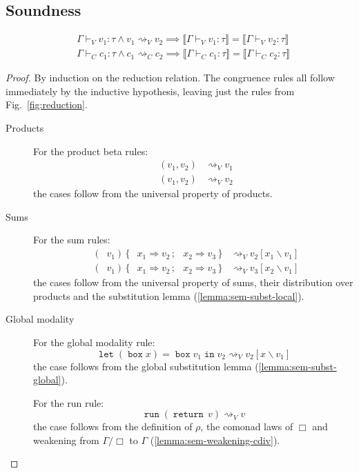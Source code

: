 \documentclass[acmsmall, screen, review, anonymous]{acmart}
\theoremstyle{definition}
\newcommand{\glob}{\mathop{\Box}}
\newcommand{\sem}[1]{\llbracket #1 \rrbracket}
\newcommand{\ununit}{\rho}
\newcommand{\seq}{\,;\,}
\newcommand{\fstname}{\mathop{\pi_1}}
\newcommand{\fst}[1]{\fstname #1}
\newcommand{\sndname}{\mathop{\pi_2}}
\newcommand{\snd}[1]{\sndname #1}
\newcommand{\inlname}{\mathop{\mathtt{in}_L}}
\newcommand{\inl}[1]{\inlname #1}
\newcommand{\inrname}{\mathop{\mathtt{in}_R}}
\newcommand{\inr}[1]{\inrname #1}
\newcommand{\casename}{\mathtt{case}}
\newcommand{\casemname}{\casename^{m}}
\newcommand{\casem}[5]{\mathop{\casemname} #1 \,\{\,\inl{#2} \Rightarrow #3 \seq \inr{#4} \Rightarrow #5 \,\}}
\newcommand{\types}{\mathrel{:}}
\newcommand{\cdiv}[1]{#1/\Box}
\newcommand{\returnname}{\mathop{\mathtt{return}}}
\newcommand{\return}[1]{\returnname\, #1}
\newcommand{\gboxname}{\mathop{\mathtt{box}}}
\newcommand{\gbox}[1]{\gboxname #1}
\newcommand{\gunbox}[3]{\mathop{\mathtt{let}} (\gbox{#1}) = #2 \mathop{\mathtt{in}} #3}
\newcommand{\grunname}{\mathtt{run}}
\newcommand{\grun}[1]{\mathop{\grunname}(#1)}
\newcommand{\sub}[2]{[#1\backslash#2]}
\newcommand{\sbst}[3]{#1\sub{#2}{#3}}
\newcommand{\turnv}{\mathrel{\vdash_V}}
\newcommand{\turnc}{\mathrel{\vdash_C}}
\newcommand{\stepstoname}{\rightsquigarrow}
\newcommand{\stepstov}{\stepstoname_V}
\newcommand{\stepstoc}{\stepstoname_C}
\begin{document}
\subsection{Soundness}

\begin{align*}
  &\Gamma \turnv v_1 \types \tau
  \wedge v_1 \stepstov v_2
  \implies \sem{\Gamma \turnv v_1 \types \tau}
    = \sem{\Gamma \turnv v_2 \types \tau} \\
  &\Gamma \turnc c_1 \types \tau
  \wedge c_1 \stepstoc c_2
  \implies \sem{\Gamma \turnc c_1 \types \tau}
    = \sem{\Gamma \turnc c_2 \types \tau}
\end{align*}
\begin{proof}
  By induction on the reduction relation. The congruence rules all
  follow immediately by the inductive hypothesis, leaving just the rules
  from Fig.~\ref{fig:reduction}.

  \begin{description}
  \item[Products] For the product beta rules:
    \begin{align*}
      \fst{(v_1, v_2)} &\stepstov v_1 \\
      \snd{(v_1, v_2)} &\stepstov v_2
    \end{align*}
    the cases follow from the universal property of products.

  \item[Sums] For the sum rules:
    \begin{align*}
      \casem{(\inl{v_1})}{x_1}{v_2}{x_2}{v_3} &\stepstov \sbst{v_2}{x_1}{v_1} \\
      \casem{(\inr{v_1})}{x_1}{v_2}{x_2}{v_3} &\stepstov \sbst{v_3}{x_2}{v_1}
    \end{align*}
    the cases follow from the universal property of sums, their distribution over
    products and the substitution lemma (\ref{lemma:sem-subst-local}).

  \item[Global modality] For the global modality rule:
    \begin{equation*}
      \gunbox{x}{\gbox{v_1}}{v_2} \stepstov \sbst{v_2}{x}{v_1}
    \end{equation*}
    the case follows from the global substitution lemma
    (\ref{lemma:sem-subst-global}).

    For the run rule:
    \begin{equation*}
      \grun{\return{v}} \stepstov v
    \end{equation*}
    the case follows from the definition of $\ununit$, the comonad laws
    of $\glob$ and weakening from $\cdiv{\Gamma}$ to $\Gamma$
    (\ref{lemma:sem-weakening-cdiv}).


\end{description}
\end{proof}
\end{document}

